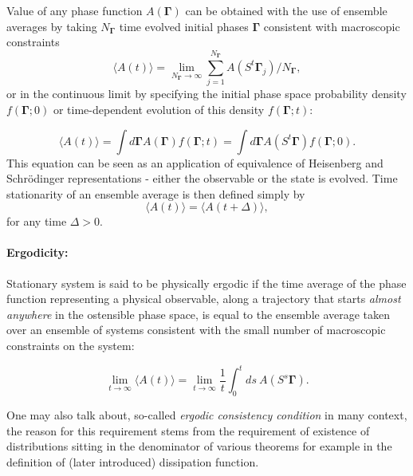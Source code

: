 \documentclass[a4paper,12pt]{article}
\begin{document}
Value of any phase function $A(\bm{\Gamma})$ can be obtained with the use of ensemble averages by taking $N_{\bm{\Gamma}} $ time evolved initial phases $\bm{\Gamma}$ consistent with macroscopic constraints
\begin{equation}
  \langle A(t) \rangle = \lim_{N_{\bm{\Gamma}}
 \to \infty} \sum_{j=1}^{N_{\bm{\Gamma}}} A(S^t \bm{\Gamma}_j)/N_{\bm{\Gamma}},
\end{equation}
or in the continuous limit by specifying the initial phase space probability density $f(\bm{\Gamma};0)$ or time-dependent evolution of this density $f(\bm{\Gamma};t)$:

\begin{equation}
  \langle A(t) \rangle = \int d\bm{\Gamma} A(\bm{\Gamma}) f(\bm{\Gamma};t) = \int d\bm{\Gamma} A(S^t\bm{\Gamma})f(\bm{\Gamma};0).
\end{equation}
This equation can be seen as an application of equivalence of Heisenberg and Schrödinger representations - either the observable or the state is evolved.
Time stationarity of an ensemble average is then defined simply by
\begin{equation}
\label{StationaryStateDef}
    \langle A(t) \rangle =   \langle A(t+\Delta) \rangle,
\end{equation}
for any time $\Delta > 0$.


\paragraph{Ergodicity:}
Stationary system is said to be physically ergodic if the time average of the phase function representing a physical observable, along a trajectory that starts \textit{almost anywhere}\cite{Evans:2241458} in the ostensible phase space, is equal to the ensemble average taken over an ensemble of systems consistent with the small number of macroscopic constraints on the system:

\begin{equation}
    \lim_{t \to \infty} \langle A(t) \rangle = \lim_{t \to \infty} \frac{1}{t} \int_0^t ds\ A(S^s \bm{\Gamma}).
\end{equation}

One may also talk about, so-called \textit{ergodic consistency condition} in many context, the reason for this requirement stems from the requirement of existence of distributions sitting in the denominator of various theorems for example in the definition of (later introduced) dissipation function.
\end{document}
